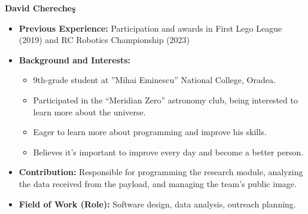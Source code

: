 \item[] \textbf{David Chereche\c{s}}
    \begin{itemize}[label=]
        \item[\faCogs] \textbf{Previous Experience:} Participation and awards in First Lego League (2019) and RC Robotics Championship (2023)
        \item[\faGraduationCap] \textbf{Background and Interests:} 
        \begin{itemize}[label=\textbullet]
            \item 9th-grade student at ”Mihai Eminescu” National College, Oradea.
            \item Participated in the “Meridian Zero” astronomy club, being interested to learn more about the universe.
            \item Eager to learn more about programming and improve his skills.
            \item Believes it’s important to improve every day and become a better person.
        \end{itemize}
        \item[\faEdit] \textbf{Contribution:} Responsible for programming the research module, analyzing the data received from the payload, and managing the team’s public image.
        \item[\faMicroscope] \textbf{Field of Work (Role):} Software design, data analysis, outreach planning.
    \end{itemize}
    \vspace{0.2 cm}
    